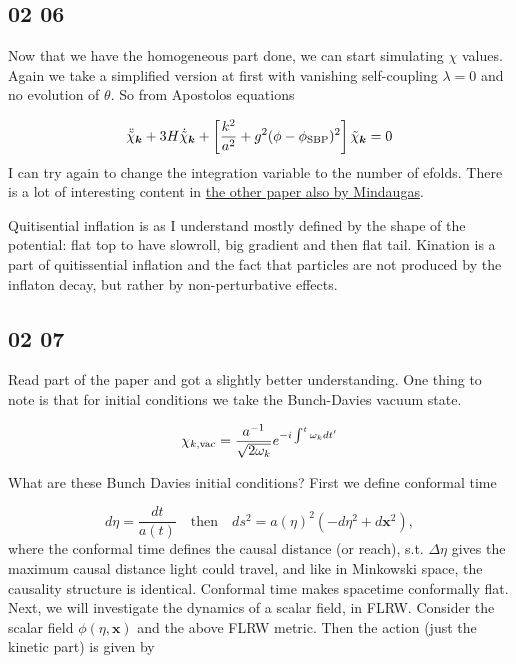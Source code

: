 \subsection*{02 06}
Now that we have the homogeneous part done, we can start simulating $\chi$ values. Again we take a simplified version at first with vanishing self-coupling $\lambda=0$ and no evolution of $\theta$. So from Apostolos equations

\begin{equation*}
    \ddot{\tilde{\chi}}_{\bm{k}} + 3H \dot{\tilde{\chi}}_{\bm{k}} + \left[ \frac{k^2}{a^2} + g^2 (\phi - \phi_{\rm SBP})^2 \right] \tilde{\chi}_{\bm{k}} = 0
\end{equation*}
I can try again to change the integration variable to the number of efolds. There is a lot of interesting content in \href{https://arxiv.org/pdf/2112.11536}{the other paper also by Mindaugas}. 

Quitisential inflation is as I understand mostly defined by the shape of the potential: flat top to have slowroll, big gradient and then flat tail. Kination is a part of quitissential inflation and the fact that particles are not produced by the inflaton decay, but rather by non-perturbative effects. 

\subsection*{02 07}
Read part of the paper and got a slightly better understanding. One thing to note is that for initial conditions we take the Bunch-Davies vacuum state. 

\begin{equation}\label{eq: bunch davies initial conditions}
    \chi_{k, {\rm vac}} = \frac{a^{-1}}{\sqrt{2 \omega_k}} e^{-i \int^t \omega_k dt^{\prime}}
\end{equation}

What are these Bunch Davies initial conditions? First we define conformal time

\begin{equation*}
    d \eta = \frac{dt}{a(t)} \quad \text{then} \quad ds^2 = a(\eta)^2(-d \eta^2 + d \bm{x}^2),
\end{equation*}
where the conformal time defines the causal distance (or reach), s.t. $\Delta \eta$ gives the maximum causal distance light could travel, and like in Minkowski space, the causality structure is identical. Conformal time makes spacetime conformally flat. Next, we will investigate the dynamics of a scalar field, in FLRW. Consider the scalar field $\phi(\eta, \bm{x})$ and the above FLRW metric. Then the action (just the kinetic part) is given by

